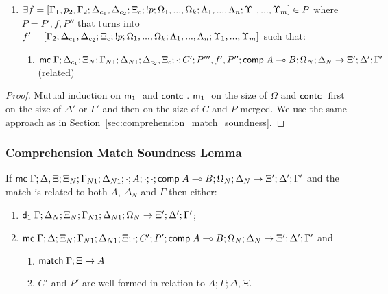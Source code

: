\begin{theorem}
\begin{itemize}
\begin{enumerate}
      \item $\exists f = [\Gamma_1, p_2, \Gamma_2; \Delta_{c_1}, \Delta_{c_2}; \Xi_c; {!} p; \Omega_1, ..., \Omega_k; \Lambda_1, ..., \Lambda_n; \Upsilon_1, ..., \Upsilon_m] \in P$ where $P = P', f, P''$ that turns into $f' = [\Gamma_2; \Delta_{c_1}, \Delta_{c_2}; \Xi_c; {!} p; \Omega_1, ..., \Omega_k; \Lambda_1, ..., \Lambda_n; \Upsilon_1, ..., \Upsilon_m]$ such that:
            \begin{enumerate}
               \item $\mathsf{mc} \; \Gamma; \Delta_{c_1}; \Xi_N; \Gamma_{N1}; \Delta_{N1}; \Delta_{c_2}, \Xi_c; \cdot; C'; P''', f', P''; \mathsf{comp} \; A \multimap B; \Omega_N; \Delta_N \rightarrow \Xi'; \Delta'; \Gamma'$ (related)
            \end{enumerate}
   \end{enumerate}
   \end{itemize}
\end{theorem}

\begin{proof}
   Mutual induction on $\mathsf{m}_1 \;$ and $\mathsf{contc} \;$. $\mathsf{m}_1 \;$ on the size of $\Omega$ and $\mathsf{contc} \;$ first on the size of $\Delta'$ or $\Gamma'$ and then on the size of $C$ and $P$ merged. We use the same approach as in Section~\ref{sec:comprehension_match_soundness}.
\end{proof}

\subsubsection{Comprehension Match Soundness Lemma}

\begin{lemma}
If $\mathsf{mc} \; \Gamma; \Delta, \Xi; \Xi_N; \Gamma_{N1}; \Delta_{N1}; \cdot; A; \cdot; \cdot; \mathsf{comp} \; A \multimap B; \Omega_N; \Delta_N \rightarrow \Xi'; \Delta'; \Gamma'$ and the match is related to both $A$, $\Delta_N$ and $\Gamma$ then either:
\begin{enumerate}
   \item $\mathsf{d}_1 \; \Gamma; \Delta_N; \Xi_N; \Gamma_{N1}; \Delta_{N1}; \Omega_N \rightarrow \Xi'; \Delta'; \Gamma'$;
   \item $\mathsf{mc} \; \Gamma; \Delta; \Xi_N; \Gamma_{N1}; \Delta_{N1}; \Xi; \cdot; C'; P'; \mathsf{comp} \; A \multimap B; \Omega_N; \Delta_N \rightarrow \Xi'; \Delta'; \Gamma'$ and
   \begin{enumerate}
      \item $\mathsf{match} \; \Gamma; \Xi \rightarrow A$
      \item $C'$ and $P'$ are well formed in relation to $A; \Gamma; \Delta, \Xi$.
   \end{enumerate}
\end{enumerate}
\end{lemma}

